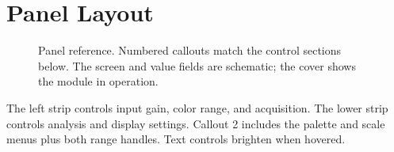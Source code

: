 \section{Panel Layout}\label{sec:panel}

\begin{figure}[!htp]
\centering
\resizebox{0.88\textwidth}{!}{}
\caption{Panel reference. Numbered callouts match the control sections
below. The screen and value fields are schematic; the cover shows the module
in operation.}
\end{figure}

The left strip controls input gain, color range, and acquisition. The lower
strip controls analysis and display settings. Callout 2 includes the palette
and scale menus plus both range handles. Text controls brighten when hovered.


